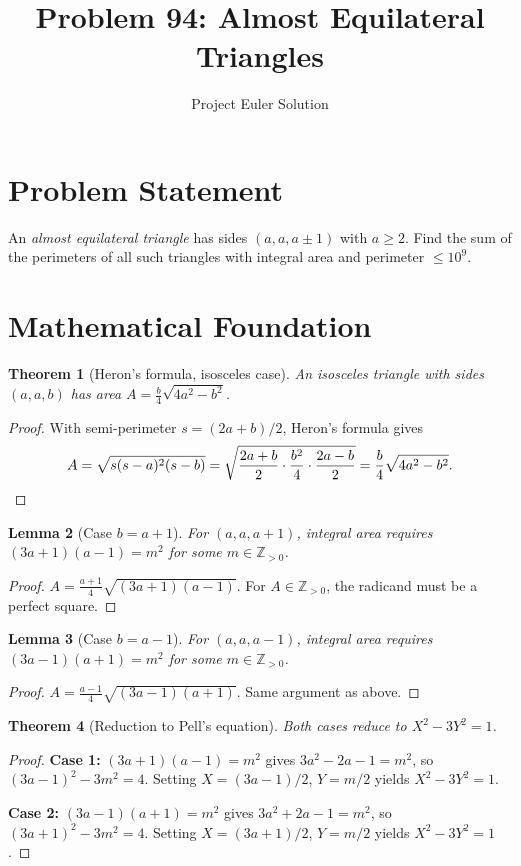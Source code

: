 \documentclass[12pt]{article}
\title{Problem 94: Almost Equilateral Triangles}
\author{Project Euler Solution}
\date{}
\newtheorem{theorem}{Theorem}
\newtheorem{lemma}[theorem]{Lemma}
\begin{document}
\maketitle

\section{Problem Statement}
An \emph{almost equilateral triangle} has sides $(a, a, a \pm 1)$ with $a \ge 2$. Find the sum of the perimeters of all such triangles with integral area and perimeter $\le 10^9$.

\section{Mathematical Foundation}

\begin{theorem}[Heron's formula, isosceles case]
An isosceles triangle with sides $(a,a,b)$ has area $A = \frac{b}{4}\sqrt{4a^2 - b^2}$.
\end{theorem}
\begin{proof}
With semi-perimeter $s = (2a+b)/2$, Heron's formula gives
\[
A = \sqrt{s(s-a)^2(s-b)} = \sqrt{\frac{2a+b}{2} \cdot \frac{b^2}{4} \cdot \frac{2a-b}{2}} = \frac{b}{4}\sqrt{4a^2 - b^2}. \qedhere
\]
\end{proof}

\begin{lemma}[Case $b = a+1$]
For $(a,a,a+1)$, integral area requires $(3a+1)(a-1) = m^2$ for some $m \in \mathbb{Z}_{>0}$.
\end{lemma}
\begin{proof}
$A = \frac{a+1}{4}\sqrt{(3a+1)(a-1)}$. For $A \in \mathbb{Z}_{>0}$, the radicand must be a perfect square.
\end{proof}

\begin{lemma}[Case $b = a-1$]
For $(a,a,a-1)$, integral area requires $(3a-1)(a+1) = m^2$ for some $m \in \mathbb{Z}_{>0}$.
\end{lemma}
\begin{proof}
$A = \frac{a-1}{4}\sqrt{(3a-1)(a+1)}$. Same argument as above.
\end{proof}

\begin{theorem}[Reduction to Pell's equation]
Both cases reduce to $X^2 - 3Y^2 = 1$.
\end{theorem}
\begin{proof}
\textbf{Case 1:} $(3a+1)(a-1) = m^2$ gives $3a^2 - 2a - 1 = m^2$, so $(3a-1)^2 - 3m^2 = 4$. Setting $X = (3a-1)/2$, $Y = m/2$ yields $X^2 - 3Y^2 = 1$.

\textbf{Case 2:} $(3a-1)(a+1) = m^2$ gives $3a^2 + 2a - 1 = m^2$, so $(3a+1)^2 - 3m^2 = 4$. Setting $X = (3a+1)/2$, $Y = m/2$ yields $X^2 - 3Y^2 = 1$.
\end{proof}
\end{document}
